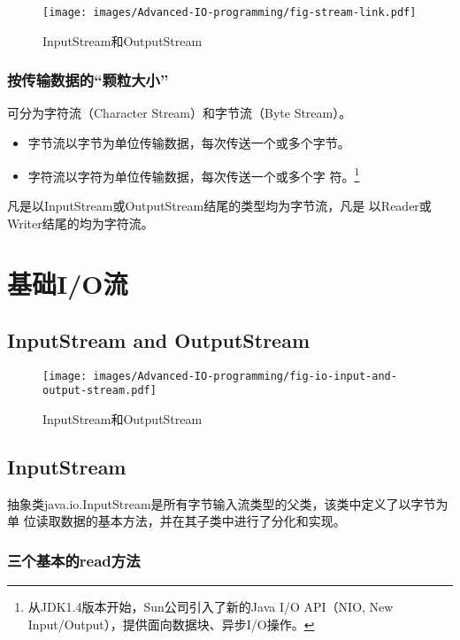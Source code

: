 \begin{figure}[htb]
\centering
\texttt{[image: images/Advanced-IO-programming/fig-stream-link.pdf]}
\caption{InputStream和OutputStream}
\label{fig:fig-stream-link}
\end{figure}

\subsubsection{按传输数据的“颗粒大小”}

{\hei 可分为字符流（Character Stream）和字节流（Byte Stream）。}

\begin{itemize}
\item 字节流以字节为单位传输数据，每次传送一个或多个字节。
\item 字符流以字符为单位传输数据，每次传送一个或多个字
  符。\footnote{从JDK1.4版本开始，Sun公司引入了新的Java I/O
    API（NIO, New Input/Output），提供面向数据块、异步I/O操作。}
\end{itemize}


凡是以InputStream或OutputStream结尾的类型均为{\hei 字节流}，凡是
以Reader或Writer结尾的均为{\hei 字符流。}

\section{基础I/O流}

\subsection{InputStream and OutputStream}

\begin{figure}[htb]
\centering
\texttt{[image: images/Advanced-IO-programming/fig-io-input-and-output-stream.pdf]}
\caption{InputStream和OutputStream}
\label{fig:fig-io-input-and-output-stream}
\end{figure}

\subsection{InputStream}

抽象类java.io.InputStream是所有字节输入流类型的父类，该类中定义了以字节为单
位读取数据的基本方法，并在其子类中进行了分化和实现。

\subsubsection{三个基本的read方法}


